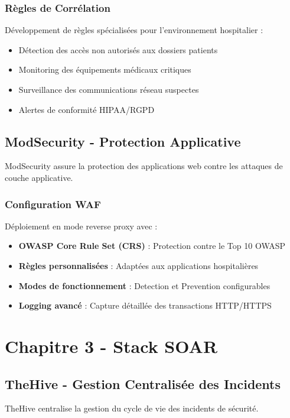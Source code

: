 \subsubsection{Règles de Corrélation}
Développement de règles spécialisées pour l'environnement hospitalier :
\begin{itemize}
    \item Détection des accès non autorisés aux dossiers patients
    \item Monitoring des équipements médicaux critiques
    \item Surveillance des communications réseau suspectes
    \item Alertes de conformité HIPAA/RGPD
\end{itemize}

\subsection{ModSecurity - Protection Applicative}

ModSecurity assure la protection des applications web contre les attaques de couche applicative.

\subsubsection{Configuration WAF}
Déploiement en mode reverse proxy avec :
\begin{itemize}
    \item \textbf{OWASP Core Rule Set (CRS)} : Protection contre le Top 10 OWASP
    \item \textbf{Règles personnalisées} : Adaptées aux applications hospitalières
    \item \textbf{Modes de fonctionnement} : Detection et Prevention configurables
    \item \textbf{Logging avancé} : Capture détaillée des transactions HTTP/HTTPS
\end{itemize}

\section{Chapitre 3 - Stack SOAR}

\subsection{TheHive - Gestion Centralisée des Incidents}

TheHive centralise la gestion du cycle de vie des incidents de sécurité.

